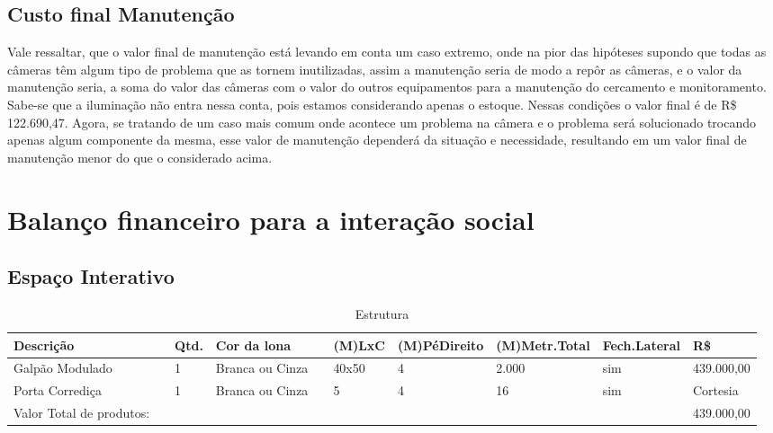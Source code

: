 \subsection{Custo final Manutenção}

	Vale ressaltar, que o valor final de manutenção está levando em conta um caso extremo, onde na pior das hipóteses supondo que todas as câmeras têm algum tipo de problema que as tornem inutilizadas, assim a manutenção seria de modo a repôr as câmeras, e o valor da manutenção seria, a soma do valor das câmeras com o valor do outros equipamentos para a manutenção do cercamento e monitoramento. Sabe-se que a iluminação não entra nessa conta, pois estamos considerando apenas o estoque. Nessas condições o valor final é de R\$ 122.690,47. Agora, se tratando de um caso mais comum onde acontece um problema na câmera e o problema será solucionado trocando apenas algum componente da mesma, esse valor de manutenção dependerá da situação e necessidade, resultando em um valor final de manutenção menor do que o considerado acima.
	
\section{Balanço financeiro para a interação social}

\subsection{Espaço Interativo}

\begin{table}[h]
\centering
\caption{Estrutura}
\label{Estrutura}
\begin{tabular}{llllllllll} \\ \hline 
Descrição                &  & Qtd. & Cor da lona     &  & (M)LxC & (M)PéDireito & (M)Metr.Total & Fech.Lateral & R\$        \\ \hline 
Galpão Modulado          &  & 1    & Branca ou Cinza &  & 40x50  & 4            & 2.000         & sim          & 439.000,00 \\ \hline 
Porta Corrediça          &  & 1    & Branca ou Cinza &  & 5      & 4            & 16            & sim          & Cortesia   \\ \hline 
Valor Total de produtos: &  &      &                 &  &        &              &               &              & 439.000,00 \\ \hline 
\end{tabular}
\end{table}

